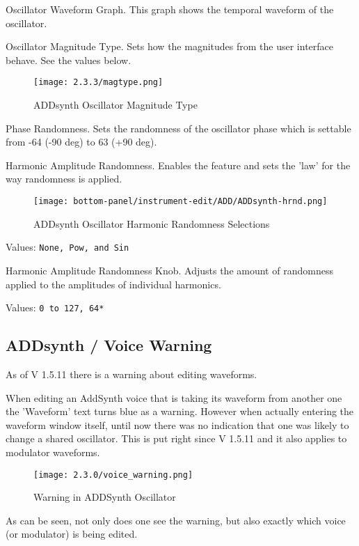    Oscillator Waveform Graph.
   This graph shows the temporal waveform  of the oscillator.

   Oscillator Magnitude Type.
   Sets how the magnitudes from the user interface behave.  See the values
   below.

   \begin{figure}[H]
   \centering
   \texttt{[image: 2.3.3/magtype.png]}
   \caption{ADDsynth Oscillator Magnitude Type}
   \label{fig:addsynth_magtype}
\end{figure}

   Phase Randomness. Sets the randomness of the oscillator phase which is
   settable from -64 (-90 deg) to 63 (+90 deg).

   Harmonic Amplitude Randomness.
   Enables the feature and sets the 'law' for the way randomness is applied.

\begin{figure}[H]
   \centering
   \texttt{[image: bottom-panel/instrument-edit/ADD/ADDsynth-hrnd.png]}
   \caption{ADDsynth Oscillator Harmonic Randomness Selections}
   \label{fig:addsynth_hrnd}
\end{figure}

   Values: \texttt{None, Pow, and Sin}

   Harmonic Amplitude Randomness Knob.
   Adjusts the amount of randomness applied to the amplitudes of individual harmonics.

   Values: \texttt{0 to 127, 64*}

\subsection{ADDsynth / Voice Warning}
\label{subsec:addsynth_voice-warning}
   As of V 1.5.11 there is a warning about editing waveforms.

   When editing an AddSynth voice that is taking its waveform from another one
   the 'Waveform' text turns blue as a warning. However when actually entering
   the waveform window itself, until now there was no indication that one was
   likely to change a shared oscillator. This is put right since V 1.5.11 and
   it also applies to modulator waveforms.

\begin{figure}[H]
   \centering
   \texttt{[image: 2.3.0/voice\_warning.png]}
   \caption{Warning in ADDSynth Oscillator}
   \label{fig:voice_oscillator_warning}
\end{figure}

   As can be seen, not only does one see the warning, but also exactly which
   voice (or modulator) is being edited.

